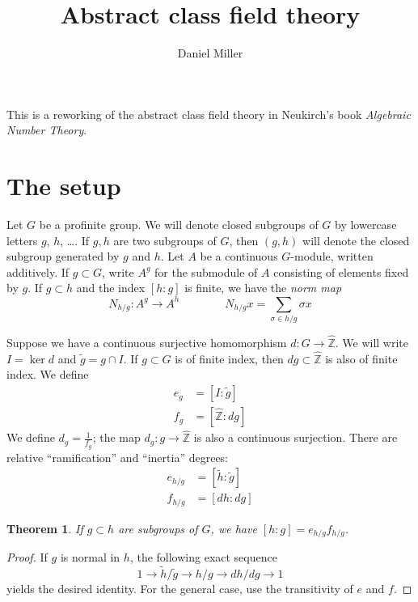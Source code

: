 \documentclass{article}
\title{Abstract class field theory}
\author{Daniel Miller}
\newcommand{\hZ}{\hat{\mathbb{Z}}}
\newtheorem{theorem}{Theorem}
\begin{document}
\maketitle





This is a reworking of the abstract class field theory in Neukirch's book 
\emph{Algebraic Number Theory}. 





\section{The setup}

Let $G$ be a profinite group. We will denote closed subgroups of $G$ by 
lowercase letters $g$, $h$, \ldots. If $g,h$ are two subgroups of $G$, then 
$(g,h)$ will denote the closed subgroup generated by $g$ and $h$. Let $A$ be a 
continuous $G$-module, written additively. If $g\subset G$, write $A^g$ for 
the submodule of $A$ consisting of elements fixed by $g$. If $g\subset h$ and 
the index $[h:g]$ is finite, we have the \emph{norm map} 
\[
  N_{h/g} : A^g\to A^h\qquad\qquad
  N_{h/g} x = \sum_{\sigma\in h/g} \sigma x
\]

Suppose we have a continuous surjective homomorphism $d:G\to \hZ$. We will 
write $I = \ker d$ and $\tilde g = g\cap I$. If $g\subset G$ is of finite 
index, then $d g\subset \hZ$ is also of finite index. We define 
\begin{align*}
  e_g &= [I : \tilde g] \\
  f_g &= [\hZ : dg]
\end{align*}
We define $d_g = \frac{1}{f_g}$; the map $d_g:g\to \hZ$ is also a continuous 
surjection. There are relative ``ramification'' and ``inertia'' degrees:
\begin{align*}
  e_{h/g} &= [\tilde h : \tilde g] \\ 
  f_{h/g} &= [d h : d g]
\end{align*}

\begin{theorem}
If $g\subset h$ are subgroups of $G$, we have $[h:g] = e_{h/g} f_{h/g}$. 
\end{theorem}
\begin{proof}
If $g$ is normal in $h$, the following exact sequence 
\[
  1 \to \tilde h/\tilde g \to h/g \to d h/d g \to 1
\]
yields the desired identity. For the general case, use the transitivity of $e$ 
and $f$.
\end{proof}
\end{document}

